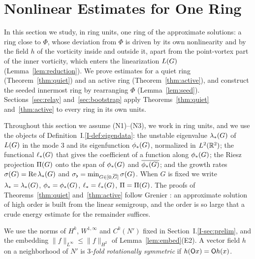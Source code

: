 \section{Nonlinear Estimates for One Ring}
\label{sec:single}

In this section we study, in ring units, one ring of the approximate solutions: a
ring close to $\Phi$, whose deviation from $\Phi$ is driven by its own
nonlinearity and by the field $h$ of the vorticity inside and outside it, apart
from the point-vortex part of the inner vorticity, which enters the linearization
$L(G)$ (Lemma~\ref{lem:reduction}). We prove estimates for a quiet ring
(Theorem~\ref{thm:quiet}) and an active ring (Theorem~\ref{thm:active}), and
construct the seeded innermost ring by rearranging $\Phi$
(Lemma~\ref{lem:seed}).
Sections~\ref{sec:relay} and~\ref{sec:bootstrap} apply Theorems~\ref{thm:quiet}
and~\ref{thm:active} to every ring in its own units.

Throughout this section we assume \textup{(N1)}--\textup{(N3)}, we work in ring
units, and we use the objects of Definition~I.\ref{I-def:eigendata}: the unstable
eigenvalue $\lambda_*(G)$ of $L(G)$ in the mode $3$ and its eigenfunction
$\phi_*(G)$, normalized in $L^2(\mathbb{R}^2)$; the functional $\ell_*(G)$ that gives the
coefficient of a function along $\phi_*(G)$; the Riesz projection $\Pi(G)$
onto the span of $\phi_*(G)$ and $\overline{\phi_*(G)}$; and the growth rates
$\sigma(G)=\Re\lambda_*(G)$ and $\sigma_\flat=\min_{G\in[0,\overline{G}]}\sigma(G)$. When $G$ is fixed
we write $\lambda_*=\lambda_*(G)$, $\phi_*=\phi_*(G)$, $\ell_*=\ell_*(G)$,
$\Pi=\Pi(G)$. The proofs of
Theorems~\ref{thm:quiet} and~\ref{thm:active} follow Grenier \cite{Grenier}: an
approximate solution of high order is built from the linear semigroup, and the order is so large that a crude energy estimate for the
remainder suffices.

We use the norms of $H^k$, $W^{1,\infty}$ and $C^k(N')$ fixed in
Section~I.\ref{I-sec:prelim}, and the embedding $\|f\|_{L^\infty}\le\|f\|_{H^2}$ of
Lemma~\ref{lem:embed}\textup{(E2)}. A vector field $h$ on a neighborhood of $N'$
is \textit{$3$-fold rotationally symmetric} if $h(\mathsf{O} x)=\mathsf{O} h(x)$.

